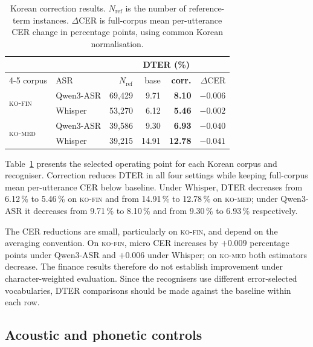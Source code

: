 \documentclass{article}
\newcommand{\corpA}{\textsc{ko-fin}}
\newcommand{\corpB}{\textsc{ko-med}}
\newcommand{\best}[1]{\textbf{#1}}
\begin{document}
\begin{table}[t]
\centering
\caption{Korean correction results. $N_{\mathrm{ref}}$ is the number of reference-term instances. $\Delta$CER is full-corpus mean per-utterance CER change in percentage points, using common Korean normalisation.}
\label{tab:main}
\setlength{\tabcolsep}{3.4pt}\small
\begin{tabular}{llrrrr}
\toprule
 & & & \multicolumn{2}{c}{DTER (\%)} & \\
\cmidrule(lr){4-5}
corpus & ASR & $N_{\mathrm{ref}}$ & base & \best{corr.} & $\Delta$CER \\
\midrule
\multirow{2}{*}{\corpA{}}
 & Qwen3-ASR & 69{,}429 & \phantom{0}9.71 & \best{\phantom{0}8.10} & $-0.006$ \\
 & Whisper   & 53{,}270 & \phantom{0}6.12 & \best{\phantom{0}5.46} & $-0.002$ \\
\multirow{2}{*}{\corpB{}}
 & Qwen3-ASR & 39{,}586 & \phantom{0}9.30 & \best{\phantom{0}6.93} & $-0.040$ \\
 & Whisper   & 39{,}215 & 14.91 & \best{12.78} & $-0.041$ \\
\bottomrule
\end{tabular}
\end{table}

Table~\ref{tab:main} presents the selected operating point for each Korean corpus and recogniser. Correction reduces DTER in all four settings while keeping full-corpus mean per-utterance CER below baseline. Under Whisper, DTER decreases from 6.12\,\% to 5.46\,\% on \corpA{} and from 14.91\,\% to 12.78\,\% on \corpB{}; under Qwen3-ASR it decreases from 9.71\,\% to 8.10\,\% and from 9.30\,\% to 6.93\,\% respectively.

The CER reductions are small, particularly on \corpA{}, and depend on the averaging convention. On \corpA{}, micro CER increases by $+0.009$ percentage points under Qwen3-ASR and $+0.006$ under Whisper; on \corpB{} both estimators decrease. The finance results therefore do not establish improvement under character-weighted evaluation. Since the recognisers use different error-selected vocabularies, DTER comparisons should be made against the baseline within each row.


\subsection{Acoustic and phonetic controls}
\label{sec:controls}
\end{document}
